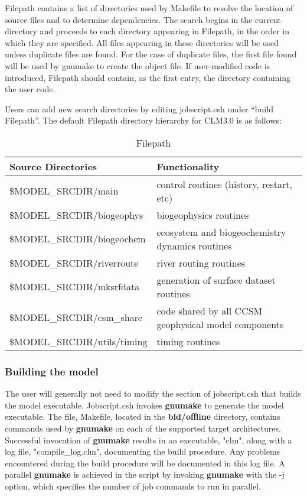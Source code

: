 Filepath contains a list of directories used by Makefile to
resolve the location of source files and to determine dependencies.
The search begins in the current directory and proceeds to each
directory appearing in Filepath, in the order in which they are
specified.  All files appearing in these directories will be used
unless duplicate files are found.  For the case of duplicate files,
the first file found will be used by gnumake to create the object
file.  If user-modified code is introduced, Filepath should contain,
as the first entry, the directory containing the user code.

Users can add new search directories by editing jobscript.csh under
``build Filepath''.  The default Filepath directory hierarchy for
CLM3.0 is as follows:

\medskip
\begin{longtable}{|p{2.5in}|p{3.5in}|} 
\caption{\label{Filepath} Filepath} \\
\hline
\endhead
\hline
{\bf Source Directories}          & {\bf Functionality} \\ \hline
  \$MODEL\_SRCDIR/main            & control routines (history, restart, etc) \\ \hline
  \$MODEL\_SRCDIR/biogeophys      & biogeophysics routines \\ \hline
  \$MODEL\_SRCDIR/biogeochem      & ecosystem and biogeochemistry dynamics routines \\ \hline
  \$MODEL\_SRCDIR/riverroute      & river routing routines \\ \hline
  \$MODEL\_SRCDIR/mksrfdata       & generation of surface dataset routines \\ \hline
  \$MODEL\_SRCDIR/csm\_share      & code shared by all CCSM geophysical model components \\ \hline
  \$MODEL\_SRCDIR/utils/timing    & timing routines \\ \hline
\end{longtable}
\medskip

\subsubsection {Building the model}
\label{subsub_build} 

The user will generally not need to modify the section of
jobscript.csh that builds the model executable.  Jobscript.csh invokes
{\bf gnumake} to generate the model executable. The file, Makefile,
located in the {\bf bld/offline} directory, contains commands used by
{\bf gnumake} on each of the supported target
architectures. Successful invocation of {\bf gnumake} results in an
executable, "clm", along with a log file, "compile\_log.clm",
documenting the build procedure.  Any problems encountered during the
build procedure will be documented in this log file.  A parallel {\bf
gnumake} is achieved in the script by invoking {\bf gnumake} with the
-j option, which specifies the number of job commands to run in
parallel.

